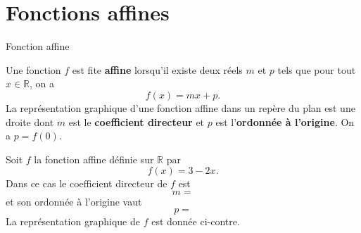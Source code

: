 \documentclass[11pt]{article}
\begin{document}
\section{Fonctions affines}
\begin{defi}{Fonction affine}
  \begin{minipage}{.47\textwidth}
  Une fonction $f$ est fite \textbf{affine} lorsqu'il existe deux réels $m$ et
  $p$ tels que pour tout $x\in\mathbb{R}$, on a
  \[
    f(x) = mx + p.
  \]
  La représentation graphique d'une fonction affine dans un repère du plan est
  une droite dont $m$ est le \textbf{coefficient directeur} et $p$ est
  l'\textbf{ordonnée à l'origine}. On a $p=f(0)$.
\end{minipage}
\hfill
  \begin{minipage}{.47\textwidth}
  \begin{center}
  \end{center}
\end{minipage}
\end{defi}

\begin{exemple}
  \begin{minipage}{.47\textwidth}
  Soit $f$ la fonction affine définie sur $\mathbb{R}$ par
  \[
    f(x) = 3-2x.
  \]
  Dans ce cas le coefficient directeur de $f$ est
  \[
    m =
  \]
  et son ordonnée à l'origine vaut
  \[
    p =
  \]
  La représentation graphique de $f$ est donnée ci-contre.
  \end{minipage}
  \hfill
  \begin{minipage}{.47\textwidth}
\begin{center}
\end{center}
  \end{minipage}
\end{exemple}
\end{document}
